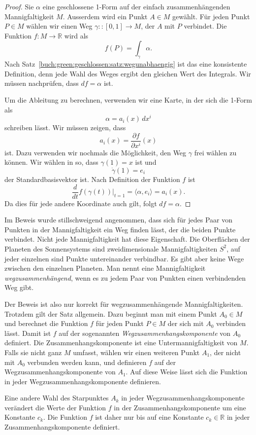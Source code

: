 \begin{proof}
Sie $\alpha$ eine geschlossene 1-Form auf der einfach zusammenhängenden
Mannigfaltigkeit $M$.
Ausserdem wird ein Punkt $A\in M$ gewählt.
Für jeden Punkt $P\in M$ wählen wir einen Weg $\gamma:\colon[0,1]\to M$,
der $A$ mit $P$ verbindet.
Die Funktion $f\colon M\to\mathbb{R}$ wird als
\[
f(P) = \int_{\gamma} \alpha.
\]
Nach Satz~\ref{buch:green:geschlossen:satz:wegunabhaengig} ist das eine
konsistente Definition, denn jede Wahl des Weges ergibt den gleichen
Wert des Integrals.
Wir müssen nachprüfen, dass $df=\alpha$ ist.

Um die Ableitung zu berechnen, verwenden wir eine Karte, in der sich die
1-Form als
\[
\alpha = a_i(x)\, dx^i
\]
schreiben lässt.
Wir müssen zeigen, dass
\[
a_i(x) = \frac{\partial f}{\partial x^i}(x)
\]
ist.
Dazu verwenden wir nochmals die Möglichkeit, den Weg $\gamma$ frei wählen
zu können.
Wir wählen in so, dass $\gamma(1)=x$ ist und
\[
\dot{\gamma}(1) = e_i
\]
der Standardbasisvektor ist.
Nach Definition der Funktion $f$ ist
\[
\frac{d}{dt}
f(\gamma(t))
\biggl|_{t=1}
=
\langle
\alpha,
e_i
\rangle
=
a_i(x).
\]
Da dies für jede andere Koordinate auch gilt, folgt $df=\alpha$.
\end{proof}

Im Beweis wurde stillschweigend angenommen, dass sich für jedes
Paar von Punkten in der Mannigfaltigkeit ein Weg finden lässt, der
die beiden Punkte verbindet.
Nicht jede Mannigfaltigkeit hat diese Eigenschaft.
Die Oberflächen der Planeten des Sonnensystems sind zweidimensionale
Mannigfaltigkeiten $S^2$, auf jeder einzelnen sind Punkte untereinander
verbindbar.
Es gibt aber keine Wege zwischen den einzelnen Planeten.
Man nennt eine Mannigfaltigkeit {\em wegzusammenhängend}, wenn es zu jedem
Paar von Punkten einen verbindenden Weg gibt.

Der Beweis ist also nur korrekt für wegzusammenhängende Mannigfaltigkeiten.
Trotzdem gilt der Satz allgemein.
Dazu beginnt man mit einem Punkt $A_0\in M$ und berechnet die Funktion $f$
für jeden Punkt $P\in M$ der sich mit $A_0$ verbinden lässt.
Damit ist $f$ auf der sogenannten {\em Wegzusammenhangskomponente} von $A_0$
definiert.
Die Zusammenhangskomponente ist eine Untermannigfaltigkeit von $M$.
Falls sie nicht ganz $M$ umfasst, wählen wir einen weiteren Punkt $A_1$,
der nicht mit $A_0$ verbunden werden kann, und definieren $f$ auf der
Wegzusammenhangskomponente von $A_1$.
Auf diese Weise lässt sich die Funktion in jeder Wegzusammenhangskomponente
definieren.

Eine andere Wahl des Starpunktes $A_k$ in jeder Wegzusammenhangskomponente
verändert die Werte der Funktion $f$ in der Zusammenhangskomponente
um eine Konstante $c_k$.
Die Funktion $f$ ist daher nur bis auf eine Konstante $c_k\in\mathbb{R}$
in jeder Zusammenhangskomponente definiert.

